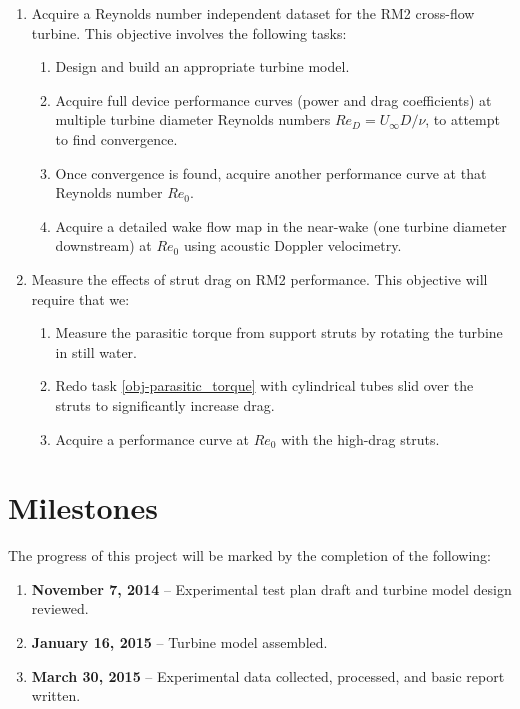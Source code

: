 \documentclass[12pt,letterpaper]{scrreprt}
\begin{document}
\begin{enumerate}

	\item Acquire a Reynolds number independent dataset for the RM2 cross-flow
	turbine. This objective involves the following tasks:

		\begin{enumerate}
			\item Design and build an appropriate turbine model.
		
			\item Acquire full device performance curves (power and drag coefficients) at
			multiple turbine diameter Reynolds numbers $Re_D = U_\infty D/ \nu$, to
			attempt to find convergence.
		  
			\item Once convergence is found, acquire another performance curve at that
			Reynolds number $Re_0$.
		
			\item Acquire a detailed wake flow map in the near-wake (one turbine diameter
			downstream) at $Re_0$ using acoustic Doppler velocimetry.
		\end{enumerate}
	
	\item Measure the effects of strut drag on RM2 performance. This objective will
	require that we:
	
	\begin{enumerate}
		\item Measure the parasitic torque from support struts by rotating the turbine
		in still water. \label{obj-parasitic_torque}
		
		\item Redo task \ref{obj-parasitic_torque} with cylindrical tubes slid over
		the struts to significantly increase drag.
		
		\item Acquire a performance curve at $Re_0$ with the high-drag struts. 
	\end{enumerate}
	
\end{enumerate}

\section{Milestones}
The progress of this project will be marked by the completion of the following:

\begin{enumerate}

	\item \textbf{November 7, 2014} -- Experimental test plan draft and turbine
	model design reviewed.
	
	\item \textbf{January 16, 2015} -- Turbine model assembled.
	
	\item \textbf{March 30, 2015} -- Experimental data collected, processed, and
	basic report written.

\end{enumerate}
\end{document}
